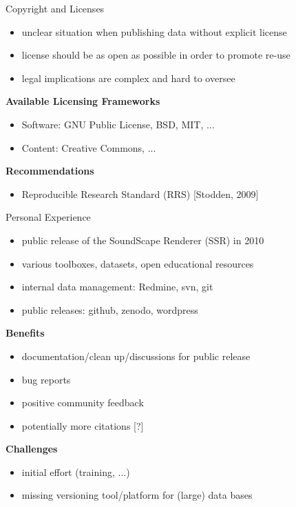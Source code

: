 \documentclass{intbeamer}
\begin{document}
\begin{frame}{Copyright and Licenses}


\begin{itemize}
\item unclear situation when publishing data without explicit license
\item license should be as open as possible in order to promote re-use
\item legal implications are complex and hard to oversee
\end{itemize}

\vfill

\textbf{Available Licensing Frameworks}
\begin{itemize}
\item Software: GNU Public License, BSD, MIT, ...
\item Content: Creative Commons, ...
\end{itemize}

\textbf{Recommendations}
\begin{itemize}
\item Reproducible Research Standard (RRS) [Stodden, 2009]
\end{itemize}

\end{frame}


\begin{frame}{Personal Experience}

\begin{itemize}
\item public release of the SoundScape Renderer (SSR) in 2010
\item various toolboxes, datasets, open educational resources
\item internal data management: Redmine, svn, git
\item public releases: github, zenodo, wordpress
\end{itemize}

\vfill

\textbf{Benefits}
\begin{itemize}
\item documentation/clean up/discussions for public release
\item bug reports
\item positive community feedback
\item potentially more citations {\tiny [?]}
\end{itemize}

\textbf{Challenges}
\begin{itemize}
\item initial effort (training, ...)
\item missing versioning tool/platform for (large) data bases
\end{itemize}

\end{frame}
\end{document}

